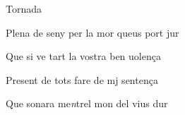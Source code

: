 \documentclass[12pt]{article}
\begin{document}
\begin{estrofaExtra}%




\begin{tornada}

Tornada

\end{tornada}


\end{estrofaExtra}


\begin{estrofa}

 Plena de seny per la mor queus port jur

 Que si ve tart la vostra ben uolen\c{c}a

 Present de tots fare de mj senten\c{c}a

 Que sonara me\textit{n}trel mon del vius dur

\end{estrofa}
\end{document}

